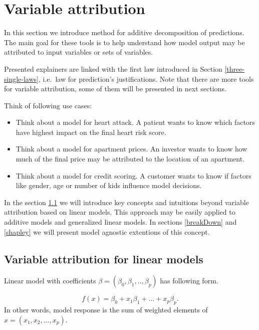 \documentclass[]{book}
\providecommand{\tightlist}{%
  \setlength{\itemsep}{0pt}\setlength{\parskip}{0pt}}
\theoremstyle{definition}
\theoremstyle{definition}
\theoremstyle{definition}
\theoremstyle{remark}
\begin{document}
\hypertarget{variable-attribution}{%
\chapter{Variable attribution}\label{variable-attribution}}

In this section we introduce method for additive decomposition of
predictions. The main goal for these tools is to help understand how
model output may be attributed to input variables or sets of variables.

Presented explainers are linked with the first law introduced in Section
\ref{three-single-laws}, i.e.~law for prediction's justifications. Note
that there are more tools for variable attribution, some of them will be
presented in next sections.

Think of following use cases:

\begin{itemize}
\tightlist
\item
  Think about a model for heart attack. A patient wants to know which
  factors have highest impact on the final heart risk score.
\item
  Think about a model for apartment prices. An investor wants to know
  how much of the final price may be attributed to the location of an
  apartment.
\item
  Think about a model for credit scoring. A customer wants to know if
  factors like gender, age or number of kids influence model decisions.
\end{itemize}

In the section \ref{VAlinMod} we will introduce key concepts and
intuitions beyond variable attribution based on linear models. This
approach may be easily applied to additive models and generalized linear
models. In sections \ref{breakDown} and \ref{shapley} we will present
model agnostic extentions of this concept.

\hypertarget{VAlinMod}{%
\section{Variable attribution for linear models}\label{VAlinMod}}

Linear model with coefficients
\(\beta = (\beta_0, \beta_1, .., \beta_p)\) has following form.

\[
f(x) = \beta_0 + x_1 \beta_1 + \ldots + x_p \beta_p.
\] In other words, model response is the sum of weighted elements of
\(x = (x_1, x_2, \ldots, x_p)\).
\end{document}

